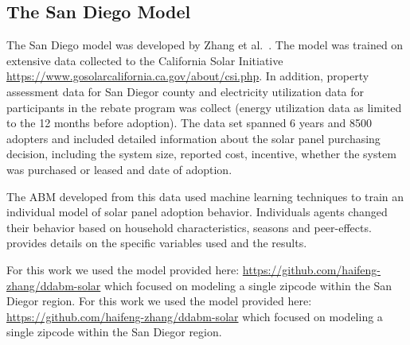 \subsection{The San Diego Model}


The San Diego model was developed by Zhang et al.~\cite{zhang16solar}. The model was trained on extensive data collected to the California Solar Initiative \url{https://www.gosolarcalifornia.ca.gov/about/csi.php}. In addition, property assessment data for San Diegor county and electricity utilization data for participants in the rebate program was collect (energy utilization data as limited to the 12 months before adoption). The data set spanned 6 years and 8500 adopters and included detailed information about the solar panel purchasing decision, including the system size, reported cost, incentive, whether the system was purchased or leased and date of adoption.

The ABM developed from this data used machine learning techniques to train an individual model of solar panel adoption behavior. Individuals agents changed their behavior based on household characteristics, seasons and peer-effects. \cite{zhang16solar} provides details on the specific variables used and the results. 

For this work we used the model provided here: \url{https://github.com/haifeng-zhang/ddabm-solar} which focused on modeling a single zipcode within the San Diegor region. For this work we used the model provided here: \url{https://github.com/haifeng-zhang/ddabm-solar} which focused on modeling a single zipcode within the San Diegor region. 

